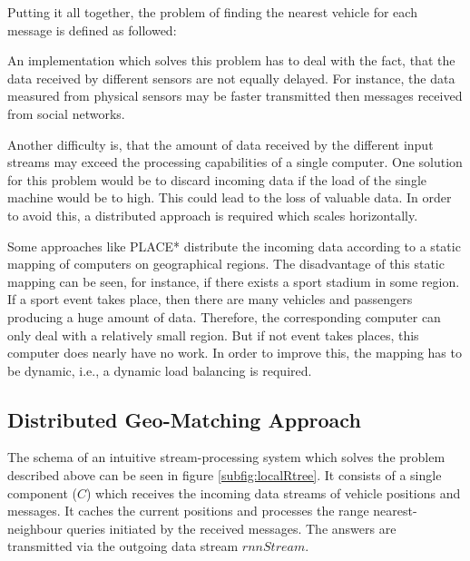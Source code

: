 Putting it all together, the problem of finding the nearest vehicle for each message is defined as followed:

{
}

An implementation which solves this problem has to deal with the fact, that the data received by different sensors are not equally delayed. For instance, the data measured from physical sensors may be faster transmitted then messages received from social networks.

Another difficulty is, that the amount of data received by the different input streams may exceed the processing capabilities of a single computer. One solution for this problem would be to discard incoming data if the load of the single machine would be to high. This could lead to the loss of valuable data. In order to avoid this, a distributed approach is required which scales horizontally.

Some approaches like PLACE* \cite{Xiong2007PAD} distribute the incoming data according to a static mapping of computers on geographical regions. The disadvantage of this static mapping can be seen, for instance, if there exists a sport stadium in some region. If a sport event takes place, then there are many vehicles and passengers producing a huge amount of data. Therefore, the corresponding computer can only deal with a relatively small region. But if not event takes places, this computer does nearly have no work. In order to improve this, the mapping has to be dynamic, i.e., a dynamic load balancing is required.

\subsection{Distributed Geo-Matching Approach}\label{sec:approach}

The schema of an intuitive stream-processing system which solves the problem described above can be seen in figure \ref{subfig:localRtree}. It consists of a single component ($C$) which receives the incoming data streams of vehicle positions and messages. It caches the current positions and processes the range nearest-neighbour queries initiated by the received messages. The answers are transmitted via the outgoing data stream $rnnStream$.

